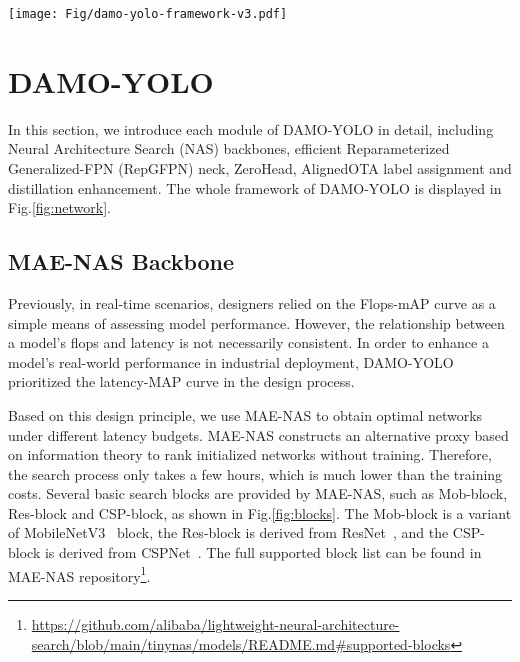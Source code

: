 \documentclass[10pt,twocolumn,letterpaper]{article}
\begin{document}
\begin{figure*}
    \begin{center}
    \texttt{[image: Fig/damo-yolo-framework-v3.pdf]} 
    \end{center}
    \vspace{-2mm}
    \caption{
       Overview of the network architecture of DAMO-YOLO. 1) MAE-NAS as backbone to extract multi-scale feature maps; 2) Efficient RepGFPN as neck to refine and fuse high-level semantic and low-level spatial features; 3) ZeroHead is presented which only contains a task projection layer for each loss.
       }
    \label{fig:network}
\end{figure*}
\section{DAMO-YOLO}
\label{sec:xxyolo}
In this section, we introduce each module of DAMO-YOLO in detail, including Neural Architecture Search (NAS) backbones, efficient Reparameterized Generalized-FPN (RepGFPN) neck, ZeroHead, AlignedOTA label assignment and distillation enhancement. The whole framework of DAMO-YOLO is displayed in Fig.\ref{fig:network}. 



\subsection{MAE-NAS Backbone}
Previously, in real-time scenarios, designers relied on the Flops-mAP curve as a simple means of assessing model performance. However, the relationship between a model's flops and latency is not necessarily consistent. In order to enhance a model's real-world performance in industrial deployment, DAMO-YOLO prioritized the latency-MAP curve in the design process. 

Based on this design principle, we use MAE-NAS\cite{maedet} to obtain optimal networks under different latency budgets. MAE-NAS constructs an alternative proxy based on information theory to rank initialized networks without training. Therefore, the search process only takes a few hours, which is much lower than the training costs. Several basic search blocks are provided by MAE-NAS, such as Mob-block, Res-block and CSP-block, as shown in Fig.\ref{fig:blocks}. The Mob-block is a variant of MobileNetV3~\cite{howard2019searching} block, the Res-block is derived from ResNet~\cite{he2016deep}, and the CSP-block is derived from CSPNet~\cite{wang2020cspnet}.
The full supported block list can be found in MAE-NAS repository\footnote{\href{https://github.com/alibaba/lightweight-neural-architecture-search/blob/main/tinynas/models/README.md\#supported-blocks}{https://github.com/alibaba/lightweight-neural-architecture-search/blob/main/tinynas/models/README.md\#supported-blocks}}.
\end{document}
